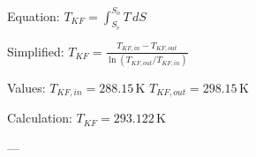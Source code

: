 Equation:  
\( T_{KF} = \int_{S_e}^{S_o} T \, dS \)  

Simplified:  
\( T_{KF} = \frac{T_{KF,in} - T_{KF,out}}{\ln(T_{KF,out}/T_{KF,in})} \)  

Values:  
\( T_{KF,in} = 288.15 \, \text{K} \)  
\( T_{KF,out} = 298.15 \, \text{K} \)  

Calculation:  
\( T_{KF} = 293.122 \, \text{K} \)  

---